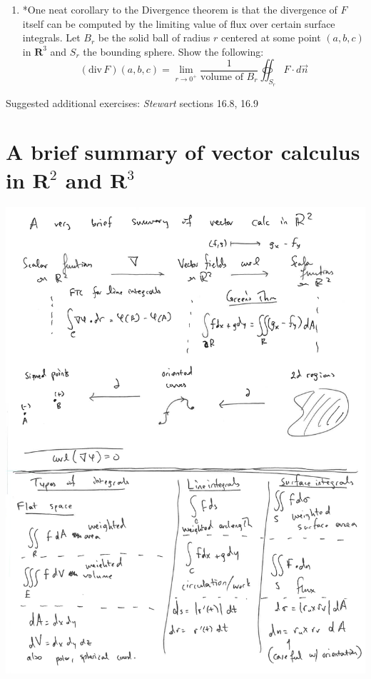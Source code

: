 \documentclass[12pt]{article}
\numberwithin{equation}{subsection}
\numberwithin{figure}{subsection}
\theoremstyle{note}
\newcommand{\dv}{\mathrm{div\,}}
\begin{document}
{\begin{enumerate}[label=\arabic*.]
\item  *One neat corollary to the Divergence theorem is that the divergence of $F$ itself can be computed by the limiting value of flux over certain surface integrals. Let $B_r$ be the solid ball of radius $r$ centered at some point $(a,b,c)$ in $\mathbf{R}^3$ and $S_r$ the bounding sphere. Show the following: \[ (\dv F) (a,b,c) = \lim_{r\to 0^+} \dfrac{1}{\text{volume of $B_r$}} \oiint_{S_r} F\cdot d\vec{n}\] 
\end{enumerate}
Suggested additional exercises: \textit{Stewart} sections 16.8, 16.9

\appendix


\section[Vector calculus summary]{A brief summary of vector calculus in $\mathbf{R}^2$ and $\mathbf{R}^3$}

\includegraphics[width=7in]{Images/r2}



}
\end{document}

